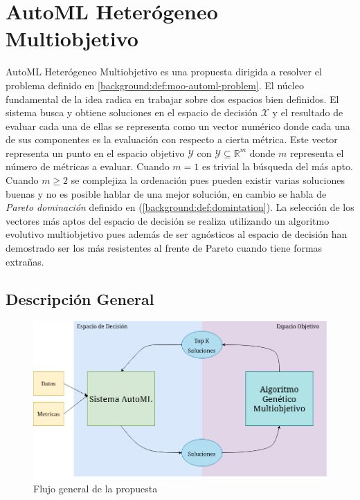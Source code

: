
\chapter{AutoML Heter\'ogeneo Multiobjetivo}\label{chapter:proposal}

AutoML Heter\'ogeneo Multiobjetivo es una propuesta dirigida a resolver el problema definido en \ref{background:def:moo-automl-problem}. El n\'ucleo fundamental de la idea radica en trabajar sobre dos espacios bien definidos. El sistema busca y obtiene soluciones en el espacio de decisi\'on $\mathcal{X}$ y el resultado  de evaluar cada una de ellas se representa como un vector num\'erico donde cada una de sus componentes es la evaluaci\'on con respecto a cierta m\'etrica. Este vector representa un punto en el espacio objetivo $\mathcal{Y}$ con $\mathcal{Y} \subseteq \mathbb{R}^m$ donde $m$ representa el n\'umero de m\'etricas a evaluar. Cuando $m = 1$ es trivial la b\'usqueda del m\'as apto. Cuando $m \ge 2$ se complejiza la ordenaci\'on pues pueden existir varias soluciones buenas y no es posible hablar de una mejor soluci\'on, en cambio se habla de \textit{Pareto dominaci\'on} definido en (\ref{background:def:domintation}). La selecci\'on de los vectores  m\'as aptos del espacio de decisi\'on se realiza utilizando un algoritmo evolutivo multiobjetivo pues adem\'as de ser agn\'osticos al espacio de decisi\'on han demostrado ser los m\'as resistentes al frente de Pareto cuando tiene formas extra\~nas.

\section{Descripci\'on General}
\begin{figure}[ht]
    \centering
    \includegraphics[scale=0.4]{Pictures/automl_moo_proposal2.png}
    \caption{Flujo general de la propuesta}
    \label{proposal:fig:flux}
\end{figure}

